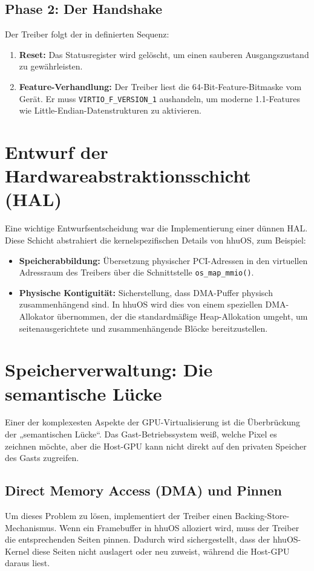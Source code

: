 \subsection{Phase 2: Der Handshake}
Der Treiber folgt der in \cite{Virtio12} definierten Sequenz:
\begin{enumerate}[label=\arabic*.]
    \item \textbf{Reset:} Das Statusregister wird gelöscht, um einen sauberen Ausgangszustand zu gewährleisten.
    \item \textbf{Feature-Verhandlung:} Der Treiber liest die 64-Bit-Feature-Bitmaske vom Gerät. Er muss \texttt{VIRTIO\_F\_VERSION\_1} aushandeln, um moderne 1.1-Features wie Little-Endian-Datenstrukturen zu aktivieren.
\end{enumerate}

\section{Entwurf der Hardwareabstraktionsschicht (HAL)}
Eine wichtige Entwurfsentscheidung war die Implementierung einer dünnen HAL.
Diese Schicht abstrahiert die kernelspezifischen Details von hhuOS, zum
Beispiel:
\begin{itemize}
    \item \textbf{Speicherabbildung:} Übersetzung physischer PCI-Adressen in den virtuellen Adressraum des Treibers über die Schnittstelle \texttt{os\_map\_mmio()}.
    \item \textbf{Physische Kontiguität:} Sicherstellung, dass DMA-Puffer physisch zusammenhängend sind. In hhuOS wird dies von einem speziellen DMA-Allokator übernommen, der die standardmäßige Heap-Allokation umgeht, um seitenausgerichtete und zusammenhängende Blöcke bereitzustellen.
\end{itemize}

\section{Speicherverwaltung: Die semantische Lücke}
Einer der komplexesten Aspekte der GPU-Virtualisierung ist die Überbrückung der
„semantischen Lücke“. Das Gast-Betriebssystem weiß, welche Pixel es zeichnen
möchte, aber die Host-GPU kann nicht direkt auf den privaten Speicher des Gasts
zugreifen.

\subsection{Direct Memory Access (DMA) und Pinnen}
Um dieses Problem zu lösen, implementiert der Treiber einen
Backing-Store-Mechanismus. Wenn ein Framebuffer in hhuOS alloziert wird, muss
der Treiber die entsprechenden Seiten pinnen. Dadurch wird sichergestellt, dass
der hhuOS-Kernel diese Seiten nicht auslagert oder neu zuweist, während die
Host-GPU daraus liest.

